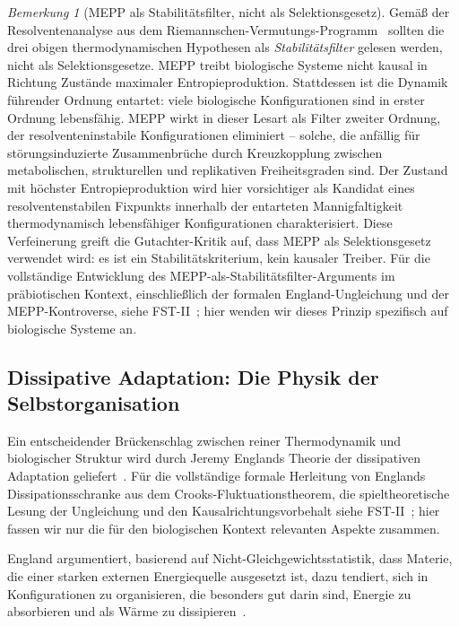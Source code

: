 \documentclass[12pt,a4paper]{article}
\theoremstyle{remark}
\newtheorem{remark}{Bemerkung}
\begin{document}
\begin{remark}[MEPP als Stabilitätsfilter, nicht als Selektionsgesetz]
\label{rem:mepp-stability-biology}
Gemäß der Resolventenanalyse aus dem Riemannschen-Vermutungs-Programm~\citep{GeigerRH2026b} sollten die drei obigen thermodynamischen Hypothesen als \emph{Stabilitätsfilter} gelesen werden, nicht als Selektionsgesetze. MEPP treibt biologische Systeme nicht kausal in Richtung Zustände maximaler Entropieproduktion. Stattdessen ist die Dynamik führender Ordnung entartet: viele biologische Konfigurationen sind in erster Ordnung lebensfähig. MEPP wirkt in dieser Lesart als Filter zweiter Ordnung, der resolventeninstabile Konfigurationen eliminiert -- solche, die anfällig für störungsinduzierte Zusammenbrüche durch Kreuzkopplung zwischen metabolischen, strukturellen und replikativen Freiheitsgraden sind. Der Zustand mit \glqq höchster Entropieproduktion\grqq{} wird hier vorsichtiger als Kandidat eines resolventenstabilen Fixpunkts innerhalb der entarteten Mannigfaltigkeit thermodynamisch lebensfähiger Konfigurationen charakterisiert. Diese Verfeinerung greift die Gutachter-Kritik auf, dass MEPP als Selektionsgesetz verwendet wird: es ist ein Stabilitätskriterium, kein kausaler Treiber. Für die vollständige Entwicklung des MEPP-als-Stabilitätsfilter-Arguments im präbiotischen Kontext, einschließlich der formalen England-Ungleichung und der MEPP-Kontroverse, siehe FST-II~\citep{FSTII}; hier wenden wir dieses Prinzip spezifisch auf biologische Systeme an.
\end{remark}

\subsection{Dissipative Adaptation: Die Physik der Selbstorganisation}

Ein entscheidender Brückenschlag zwischen reiner Thermodynamik und biologischer Struktur wird durch Jeremy Englands Theorie der dissipativen Adaptation geliefert~\citep{England2013,EnglandNano}. Für die vollständige formale Herleitung von Englands Dissipationsschranke aus dem Crooks-Fluktuationstheorem, die spieltheoretische Lesung der Ungleichung und den Kausalrichtungsvorbehalt siehe FST-II~\citep{FSTII}; hier fassen wir nur die für den biologischen Kontext relevanten Aspekte zusammen.

England argumentiert, basierend auf Nicht-Gleichgewichtsstatistik, dass Materie, die einer starken externen Energiequelle ausgesetzt ist, dazu tendiert, sich in Konfigurationen zu organisieren, die besonders gut darin sind, Energie zu absorbieren und als Wärme zu dissipieren~\citep{England2013}.
\end{document}
